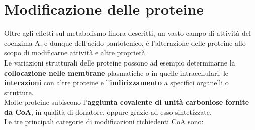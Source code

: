 \documentclass[a4paper, 12pt]{article}
\begin{document}
\section{Modificazione delle proteine}
Oltre agli effetti sul metabolismo finora descritti, un vasto campo di attività del coenzima A, e dunque dell'acido pantotenico, è l'alterazione delle proteine allo scopo di modificarne attività e altre proprietà.\\
Le variazioni strutturali delle proteine possono ad esempio determinarne la \textbf{collocazione nelle membrane} plasmatiche o in quelle intracellulari, le \textbf{interazioni} con altre proteine e l'\textbf{indirizzamento} a specifici organelli o strutture.\\
Molte proteine subiscono l'\textbf{aggiunta covalente di unità carboniose fornite da CoA}, in qualità di donatore, oppure grazie ad esso sintetizzate.\\
Le tre principali categorie di modificazioni richiedenti CoA sono:
\end{document}
